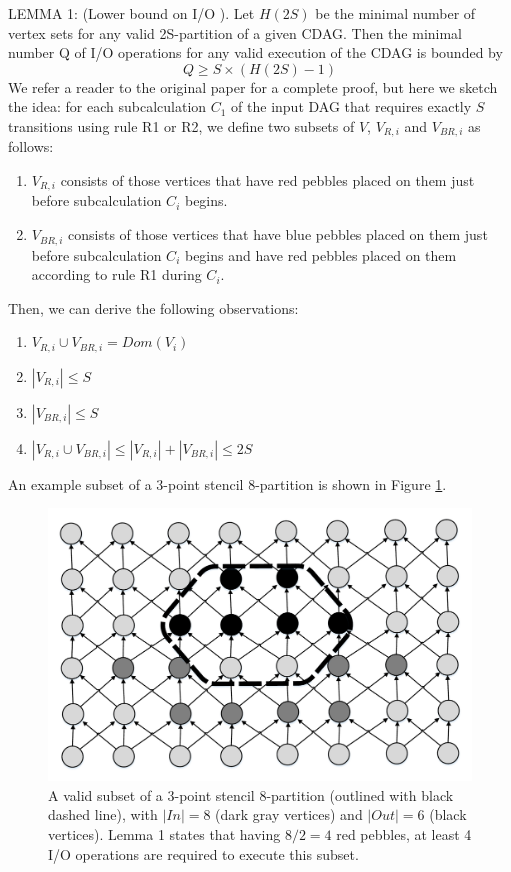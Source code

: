 \documentclass[sigconf]{acmart}
\begin{document}
	LEMMA 1: (Lower bound on I/O \cite{redblue}). Let $H(2S)$ be the minimal 
	number of 
	vertex sets for any valid 2S-partition of a given CDAG. Then the minimal 
	number Q of I/O operations for any valid execution of the CDAG is bounded 
	by	
	\begin{equation}
	\label{eq:redbluebound}
	Q \ge S \times (H(2S) - 1)
	\end{equation}
	We refer a reader to the original paper for a complete proof, but here we 
	sketch the idea: for each subcalculation $C_1$ of the input DAG that 
	requires exactly $S$ transitions using rule R1 or R2, we define two subsets 
	of $V$, $V_{R,i}$ and $V_{BR,i}$ as 
	follows:
	\begin{enumerate}
		\item $V_{R,i}$ consists of those vertices that have red pebbles placed 
		on 
		them just before subcalculation $C_i$ begins.
		\item $V_{BR,i}$ consists of those vertices that have blue pebbles 
		placed 
		on them just before subcalculation $C_i$ begins and have red pebbles 
		placed on them according to rule R1 during $C_i$.
	\end{enumerate}
	
	Then, we can derive the following observations:
	\begin{enumerate}
		\item $V_{R,i} \cup V_{BR,i} = Dom(V_i)$
		\item $|V_{R,i}| \le S$
		\item $|V_{BR,i}| \le S$
		\item $|V_{R,i} \cup V_{BR,i}| \le |V_{R,i}| + |V_{BR,i}| \le 2S$
	\end{enumerate}
	
	An example subset of a 3-point stencil 8-partition is shown in Figure 
	\ref{fig:spart-stencil}.
	
	\begin{figure}
		\includegraphics[width=2\columnwidth/3]{figures/stencils}
		\caption{A valid subset of a 3-point stencil 8-partition (outlined with 
		black dashed line), with $|In| = 8$ (dark gray vertices) and $|Out| = 
		6$ (black vertices). Lemma 1 states that having $8/2 = 4$ red pebbles, 
		at least 4 I/O operations are required to execute this subset.}
		\label{fig:spart-stencil}
	\end{figure}
\end{document}
